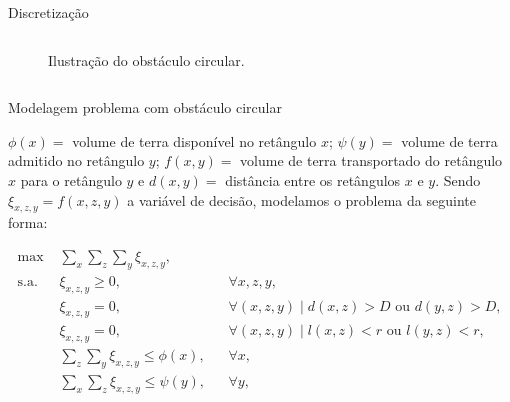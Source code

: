 \documentclass[11pt]{beamer}
\begin{document}
\begin{frame}{Discretização}
{\begin{columns}
\begin{figure}
    \caption{Ilustra\c{c}\~{a}o do obstáculo circular.}
    \label{fig:disc_J_A_R}
  \end{figure}
\end{columns}
}
\end{frame}

\begin{frame}{Modelagem problema com obstáculo circular}
\begin{block}{}
\small $\phi(x)=$ volume de terra disponível no retângulo $x$; $\psi(y)=$ volume de terra admitido no retângulo $y$; $f(x, y)=$ volume de terra transportado do retângulo $x$ para o retângulo $y$ e $d(x, y)=$ distância entre os retângulos $x$ e $y$. Sendo $\xi_{x, z, y} = f(x, z, y)$ a variável de decisão, modelamos o
problema da seguinte forma:
\end{block}
\small
\begin{subequations}
    \begin{align}
        \text{max } & \sum_{x} \sum_{z} \sum_{y} \xi_{x, z, y},
        \label{eq:model_with_obs_nl:obj_func} \\
        \text{s.a. } & \xi_{x, z, y} \geq 0, && \forall x, z, y,
        \label{eq:model_with_obs_nl:var} \\
        & \xi_{x, z, y} = 0, && \forall (x, z, y) \mid d(x, z) > D \text{ ou } 
        d(y, z) > D,
        \label{eq:model_with_obs_nl:max_dist} \\
        & \xi_{x, z, y} = 0, && \forall (x, z, y) \mid l(x, z) < r \text{ ou }
        l(y, z) < r,
        \label{eq:model_with_obs_nl:dist_obs} \\
        & \sum_{z} \sum_{y} \xi_{x, z, y} \leq \phi(x), && \forall x,
        \label{eq:model_with_obs_nl:max_jazida} \\
        & \sum_{x} \sum_{z} \xi_{x, z, y} \leq \psi(y), && \forall y,
        \label{eq:model_with_obs_nl:max_aterro}
    \end{align}
    \label{eq:model_with_obs_nl}
\end{subequations}
\end{frame}
\end{document}
